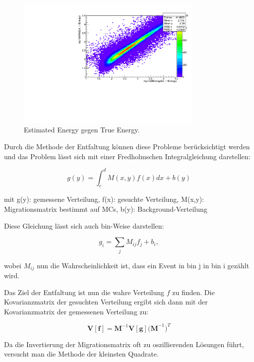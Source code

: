 \begin{figure}
    \centering
    \includegraphics[width=0.8\textwidth]{./Plots/04_MrkAnalyse/EnergyEst_EnergyTrue.pdf}
    \caption{Estimated Energy gegen True Energy.}
    \label{EnergyEst_EnergyTrue}
\end{figure}

Durch die Methode der Entfaltung können diese Probleme berücksichtigt werden und das Problem lässt sich mit einer Fredholmschen Integralgleichung darstellen:

\begin{equation}
 g(y)= \int_c^d M(x,y) f(x) dx + b(y)
\end{equation}
\begin{centering}
  \tiny{mit g(y): gemessene Verteilung, f(x): gesuchte Verteilung, M(x,y): Migrationsmatrix bestimmt auf MCs, b(y): Background-Verteilung}
 \end{centering}

Diese Gleichung lässt sich auch bin-Weise darstellen:

\begin{equation}
 g_i=\sum_j M_{ij}f_j+b_i,
\end{equation}

wobei $M_{ij}$ nun die Wahrscheinlichkeit ist, dass ein Event in bin j in bin i gezählt wird.

Das Ziel der Entfaltung ist nun die wahre Verteilung $f$ zu finden.
Die Kovarianzmatrix der gesuchten Verteilung ergibt sich dann mit der Kovarianzmatrix der gemessenen Verteilung zu:

\begin{equation}
 \mathbf{V[f]}=\mathbf{M}^{-1}\mathbf{V[g]}\mathbf{(M}^{-1})^T
\end{equation}

Da die Invertierung der Migrationsmatrix oft zu oszillierenden Lösungen führt, versucht man die Methode der kleinsten Quadrate.

